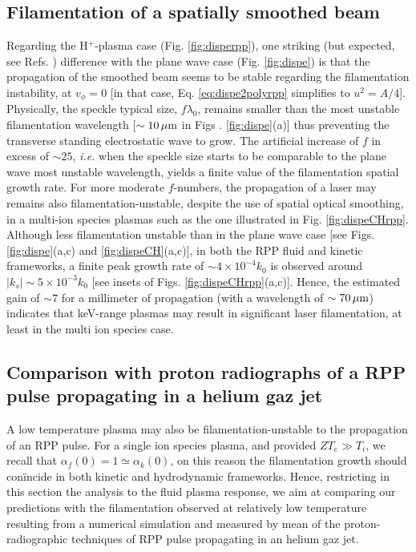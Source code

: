 \documentclass[
 reprint,
 amsmath,amssymb,
 aps,
]{revtex4-1}
\begin{document}
\subsection{Filamentation of a spatially smoothed beam}
Regarding the H$^+$-plasma case (Fig. \ref{fig:disperpp}), one striking (but expected, see Refs. \cite[]{NatPhys_Glenzer,PRL_Sarri_2011}) difference with the plane wave case  (Fig. \ref{fig:dispe}) is that the propagation of the smoothed beam seems to be stable regarding the filamentation instability, at $v_\phi=0$ [in that case, Eq. \eqref{eq:dispe2polyrpp} simplifies to $u^2=A/4$].
Physically, the speckle typical size, $f\lambda_0$, remains smaller than the most unstable filamentation wavelength [$\sim 10 \,\rm\mu m$ in Figs . \ref{fig:dispe}(a)] thus preventing the transverse standing electrostatic wave to grow. The artificial increase of $f$ in excess of $\sim 25$, \emph{i.e.} when the speckle size starts to be comparable to the plane wave most unstable wavelength,  yields a finite value of the filamentation spatial growth rate. For more moderate  $f$-numbers, the propagation of a laser may remains also filamentation-unstable, despite the use of spatial optical smoothing,  in  a multi-ion species plasmas such as the one illustrated in Fig. \ref{fig:dispeCHrpp}. Although less filamentation unstable than in the plane wave case [see Figs. \ref{fig:dispe}(a,c) and \ref{fig:dispeCH}(a,c)], in both the RPP fluid and kinetic frameworks, a finite peak growth rate of $\sim 4\times 10^{-4}k_0 $ is observed around $\vert k_s\vert \sim 5\times 10^{-3}k_0$ [see insets of Figs. \ref{fig:dispeCHrpp}(a,c)].
Hence, the estimated  gain of $\sim 7$   for a millimeter of propagation (with a wavelength of $\sim 70 \,\rm \mu m$) indicates that keV-range plasmas may result in significant laser filamentation, at least in the multi ion species case.

\subsection{Comparison with proton radiographs of a RPP pulse propagating in a helium gaz jet}
A low temperature plasma may also be filamentation-unstable to the  propagation of an RPP pulse.
For a single ion species plasma, and provided $ZT_e\gg T_i$,   we recall that $\alpha_f(0)=1\simeq \alpha_k(0)$, on this reason the filamentation growth should con\"incide in both  kinetic and hydrodynamic frameworks. 
Hence, restricting in this section the analysis to the fluid plasma response, we aim at comparing our predictions with the filamentation observed at relatively low temperature resulting from a numerical simulation and measured by mean of the proton-radiographic techniques of RPP pulse propagating  in an helium gaz jet.
\end{document}
